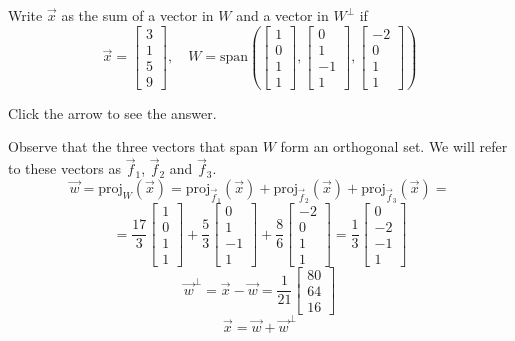 \documentclass{ximera}
\begin{document}
\begin{problem}\label{OrthoDecomp3}  Write $\vec{x}$ as the sum of a vector in $W$ and a vector in $W^\perp$ if
$$\vec{x} = \begin{bmatrix}3\\ 1\\ 5\\ 9\end{bmatrix}, \quad W = \mbox{span}\left(\begin{bmatrix}1\\ 0\\ 1\\ 1\end{bmatrix}, \begin{bmatrix}0\\ 1\\ -1\\ 1\end{bmatrix}, \begin{bmatrix}-2\\ 0\\ 1\\ 1\end{bmatrix}\right)$$

Click the arrow to see the answer.
\begin{expandable}
Observe that the three vectors that span $W$ form an orthogonal set.  We will refer to these vectors as $\vec{f}_1$, $\vec{f}_2$ and $\vec{f}_3$.
$$\vec{w}=\text{proj}_W(\vec{x})=\text{proj}_{\vec{f}_1}(\vec{x})+\text{proj}_{\vec{f}_2}(\vec{x})+\text{proj}_{\vec{f}_3}(\vec{x})=$$
$$=\frac{17}{3}\begin{bmatrix}1\\0\\1\\1\end{bmatrix}+\frac{5}{3}\begin{bmatrix}0\\1\\-1\\1\end{bmatrix}+\frac{8}{6}\begin{bmatrix}-2\\0\\1\\1\end{bmatrix}=\frac{1}{3}\begin{bmatrix}0\\-2\\-1\\1\end{bmatrix}$$
$$\vec{w}^{\perp}=\vec{x}-\vec{w}=\frac{1}{21}\begin{bmatrix}80\\64\\16\end{bmatrix}$$
$$\vec{x}=\vec{w}+\vec{w}^{\perp}$$
\end{expandable}
\end{problem}
\end{document}
